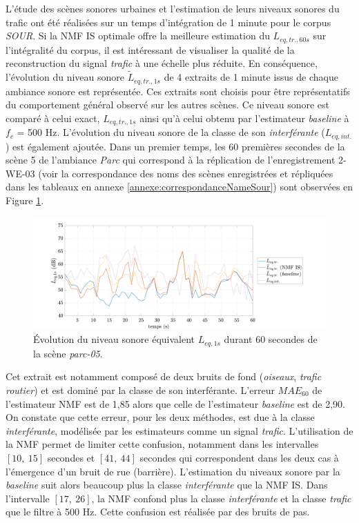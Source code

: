 L'étude des scènes sonores urbaines et l'estimation de leurs niveaux sonores du trafic ont été réalisées sur un temps d'intégration de 1 minute pour le corpus \textit{SOUR}. 
Si la NMF IS optimale offre la meilleure estimation du $L_{eq,tr.,60s}$ sur l'intégralité du corpus, il est intéressant de visualiser la qualité de la reconstruction du signal \textit{trafic} à une échelle plus réduite. En conséquence, l'évolution du niveau sonore $\tilde{L}_{eq,tr.,1s}$ de 4 extraits de 1 minute issus de chaque ambiance sonore est représentée. Ces extraits sont choisis pour être représentatifs du comportement général observé sur les autres scènes. Ce niveau sonore est comparé à celui exact, $L_{eq,tr.,1s}$ ainsi qu'à celui obtenu par l'estimateur \textit{baseline} à $f_c$ = 500 Hz. L'évolution du niveau sonore de la classe de son \textit{interférante} ($L_{eq,int.}$) est également ajoutée. 
Dans un premier temps, les 60 premières secondes de la scène 5 de l'ambiance \textit{Parc} qui correspond à la réplication de l'enregistrement 2-WE-03 (voir la correspondance des noms des scènes enregistrées et répliquées dans les tableaux en annexe \ref{annexe:correspondanceNameSour}) sont observées en Figure \ref{fig:Lp_parc}.


\begin{figure}[h!]
\centering
\includegraphics[width=.8\linewidth]{./figures/NMF/Lp_park_5.pdf} 
\caption{Évolution du niveau sonore équivalent $L_{eq, 1s}$ durant 60 secondes de la scène \textit{parc-05}.} 
\label{fig:Lp_parc}
\end{figure}

Cet extrait est notamment composé de deux bruits de fond (\textit{oiseaux}, \textit{trafic routier}) et est dominé par la classe de son interférante. 
L'erreur $MAE_{60}$ de l'estimateur NMF est de 1,85 alors que celle de l'estimateur \textit{baseline} est de 2,90. 
On constate que cette erreur, pour les deux méthodes, est due à la classe \textit{interférante}, modélisée par les estimateurs comme un signal \textit{trafic}. L'utilisation de la NMF permet de limiter cette confusion, notamment dans les intervalles $\left[10,~15 \right]$ secondes et $\left[ 41,~44 \right]$ secondes qui correspondent dans les deux cas à l'émergence d'un bruit de rue (barrière). L'estimation du niveaux sonore par la \textit{baseline} suit alors beaucoup plus la classe \textit{interférante} que la NMF IS. Dans l'intervalle $\left[17,~26 \right]$, la NMF confond plus la classe \textit{interférante} et la classe \textit{trafic} que le filtre à 500 Hz. Cette confusion est réalisée par des bruits de pas.  

